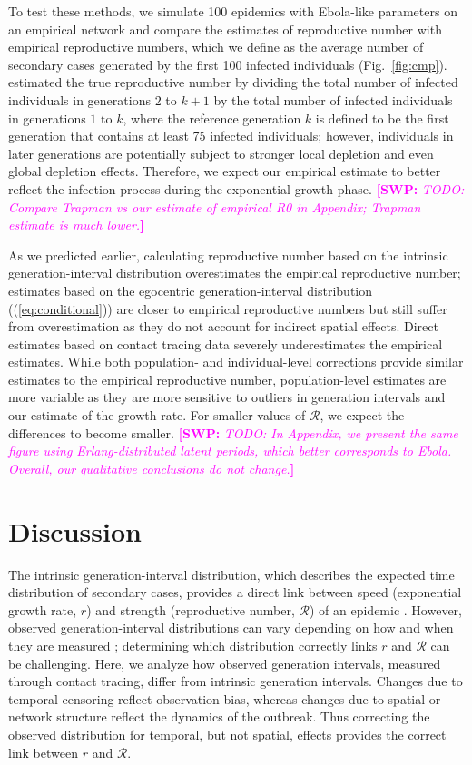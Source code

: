 \documentclass[12pt]{article}
\newcommand{\eref}[1]{(\ref{eq:#1})}
\newcommand{\fref}[1]{Fig.~\ref{fig:#1}}
\newcommand{\RR}{\ensuremath{{\mathcal R}}}
\newcommand{\comment}[3]{\textcolor{#1}{\textbf{[#2: }\textsl{#3}\textbf{]}}}
\newcommand{\swp}[1]{\comment{magenta}{SWP}{#1}}
\begin{document}
To test these methods, we simulate 100 epidemics with Ebola-like parameters on an empirical network \citep{leskovec2016snap} and compare the estimates of reproductive number with empirical reproductive numbers, which we define as the average number of secondary cases generated by the first 100 infected individuals (\fref{cmp}).
\cite{trapman2016inferring} estimated the true reproductive number by dividing the total number of infected individuals in generations $2$ to $k+1$ by the total number of infected individuals in generations $1$ to $k$, where the reference generation $k$ is defined to be the first generation that contains at least 75 infected individuals;
however, individuals in later generations are potentially subject to stronger local depletion and even global depletion effects.
Therefore, we expect our empirical estimate to better reflect the infection process during the exponential growth phase.
\swp{TODO: Compare Trapman vs our estimate of empirical R0 in Appendix; Trapman estimate is much lower.}

As we predicted earlier, calculating reproductive number based on the intrinsic generation-interval distribution overestimates the empirical reproductive number;
estimates based on the egocentric generation-interval distribution (\eref{conditional}) are closer to empirical reproductive numbers but still suffer from overestimation as they do not account for indirect spatial effects.
Direct estimates based on contact tracing data severely underestimates the empirical estimates.
While both population- and individual-level corrections provide similar estimates to the empirical reproductive number,
population-level estimates are more variable as they are more sensitive to outliers in generation intervals and our estimate of the growth rate.
For smaller values of \RR, we expect the differences to become smaller. 
\swp{TODO: In Appendix, we present the same figure using Erlang-distributed latent periods, which better corresponds to Ebola. Overall, our qualitative conclusions do not change.}

\section{Discussion}

The intrinsic generation-interval distribution, which describes the expected time distribution of secondary cases, provides a direct link between speed (exponential growth rate, $r$) and strength (reproductive number, $\RR$) of an epidemic \citep{wallinga2007generation, svensson2007note, svensson2015influence, park2019practical}.
However, observed generation-interval distributions can vary depending on how and when they are measured \citep{nishiura2010time, tomba2010some, champredon2015intrinsic, britton2019estimation};
determining which distribution correctly links $r$ and $\RR$ can be challenging.
Here, we analyze how observed generation intervals, measured through contact tracing, differ from intrinsic generation intervals.
Changes due to temporal censoring reflect observation bias, whereas changes due to spatial or network structure reflect the dynamics of the outbreak.
Thus correcting the observed distribution for temporal, but not spatial, effects provides the correct link between $r$ and $\RR$.
\end{document}
